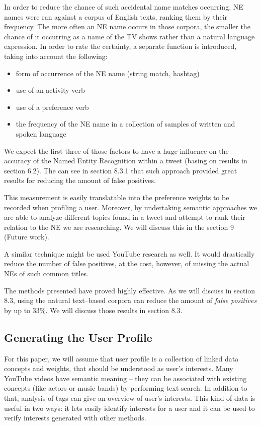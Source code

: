 In order to reduce the chance of such accidental name matches occurring, NE names were ran against a corpus
of English texts, ranking them by their frequency. The more often an NE name occurs in those corpora, the smaller the chance of it occurring as a name of the TV shows rather than a natural language expression. In order to rate the certainty, a separate function is introduced, taking into account the following:

\begin{itemize}
  \item form of occurrence of the NE name (string match, hashtag)
  \item use of an activity verb
  \item use of a preference verb
  \item the frequency of the NE name in a collection of samples of written and spoken language
\end{itemize}

We expect the first three of those factors to have a huge influence on the accuracy of the Named Entity Recognition within
a tweet (basing on results in section 6.2). The can see in section 8.3.1 that such approach provided great results for
reducing the amount of false positives.

This measurement is easily translatable into the preference weights to be recorded when profiling a user.
Moreover, by undertaking semantic approaches we are able to analyze different topics found in a tweet and
attempt to rank their relation to the NE we are researching. We will discuss this in the section 9 (Future work).

A similar technique might be used YouTube research as well. It would drastically reduce the number of
false positives, at the cost, however, of missing the actual NEs of such common titles.

The methods presented have proved highly effective. As we will discuss in section 8.3, using the natural
text--based corpora can reduce the amount of \textit{false positives} by up to 33\%. We will discuss those
results in section 8.3.

\subsection{Generating the User Profile}

For this paper, we will assume that user profile is a collection of linked data concepts and weights,
that should be understood as user's interests. Many YouTube videos have semantic meaning -- they can
be associated with existing concepts (like actors or music bands) by performing text search.
In addition to that, analysis of tags can give an overview of user's interests. This kind of data is
useful in two ways: it lets easily identify interests for a user and it can be
used to verify interests generated with other methods.

